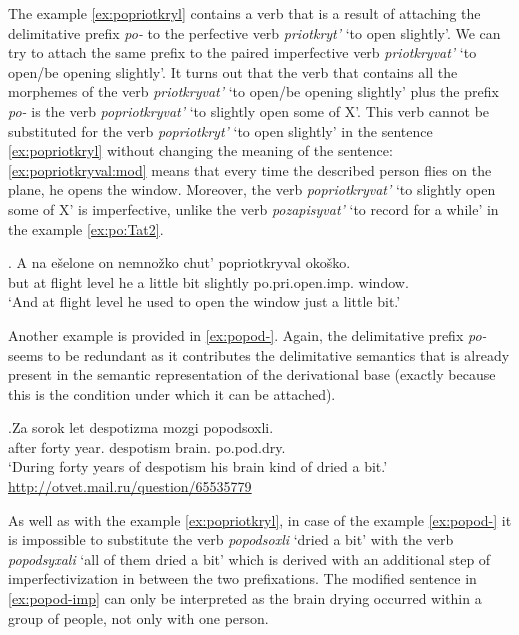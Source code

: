 The example \ref{ex:popriotkryl} contains a verb that is a result of attaching the delimitative prefix \textit{po-} to the perfective verb \textit{priotkryt'\textsuperscript{\PF}} `to open slightly'. We can try to attach the same prefix to the paired imperfective verb \textit{priotkryvat'}\textsuperscript{\IPF} `to open/be opening slightly'. It turns out that the verb that contains all the morphemes of the verb \textit{priotkryvat'}\textsuperscript{\IPF} `to open/be opening slightly' plus the prefix \textit{po-} is the verb \textit{popriotkryvat'} `to slightly open some of X'. This verb cannot be substituted for the verb \textit{popriotkryt'}\textsuperscript{\PF} `to open slightly' in the sentence \ref{ex:popriotkryl} without changing the meaning of the sentence: \ref{ex:popriotkryval:mod} means that every time the described person flies on the plane, he opens the window. Moreover, the verb \textit{popriotkryvat'} `to slightly open some of X' is imperfective, unlike the verb \textit{pozapisyvat'} `to record for a while' in the example \ref{ex:po:Tat2}.

\exg. \label{ex:popriotkryval:mod}A na e\v{s}elone on nemno\v{z}ko chut' popriotkryval\textsuperscript{\IPF} oko\v{s}ko.\\
but at {flight level} he {a little bit} {slightly} po.pri.open.imp. window.\\
\trans `And at flight level he used to open the window just a little bit.'

Another example is provided in \ref{ex:popod-}. Again, the delimitative prefix \textit{po-} seems to be redundant as it contributes the delimitative semantics that is already present in the semantic representation of the derivational base (exactly because this is the condition under which it can be attached).

\exg.\label{ex:popod-}Za sorok let despotizma mozgi popodsoxli.\\
after forty year. despotism brain. po.pod.dry.\\
\trans `During forty years of despotism his brain kind of dried a bit.'\\\hbox{}\hfill\hbox{\url{http://otvet.mail.ru/question/65535779}}

As well as with the example \ref{ex:popriotkryl}, in case of the example \ref{ex:popod-} it is impossible to substitute the verb \textit{popodsoxli}\textsuperscript{\PF} `dried a bit' with the verb \textit{popodsyxali}\textsuperscript{\PF} `all of them dried a bit' which is derived with an additional step of imperfectivization in between the two prefixations. The modified sentence in \ref{ex:popod-imp} can only be interpreted as the brain drying occurred within a group of people, not only with one person.  

